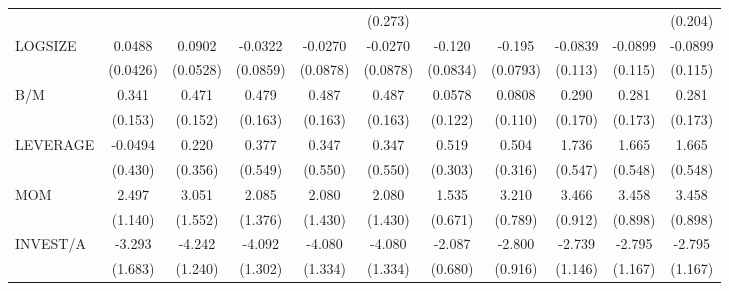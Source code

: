 \begin{table}[htbp]
\begin{tabular}{l*{10}{c}}
                &                  &                  &                  &                  &  (0.273)         &                  &                  &                  &                  &  (0.204)         \\
LOGSIZE         &   0.0488         &   0.0902\sym{*}  &  -0.0322         &  -0.0270         &  -0.0270         &   -0.120         &   -0.195\sym{**} &  -0.0839         &  -0.0899         &  -0.0899         \\
                & (0.0426)         & (0.0528)         & (0.0859)         & (0.0878)         & (0.0878)         & (0.0834)         & (0.0793)         &  (0.113)         &  (0.115)         &  (0.115)         \\
B/M             &    0.341\sym{**} &    0.471\sym{***}&    0.479\sym{***}&    0.487\sym{***}&    0.487\sym{***}&   0.0578         &   0.0808         &    0.290\sym{*}  &    0.281         &    0.281         \\
                &  (0.153)         &  (0.152)         &  (0.163)         &  (0.163)         &  (0.163)         &  (0.122)         &  (0.110)         &  (0.170)         &  (0.173)         &  (0.173)         \\
LEVERAGE        &  -0.0494         &    0.220         &    0.377         &    0.347         &    0.347         &    0.519\sym{*}  &    0.504         &    1.736\sym{***}&    1.665\sym{***}&    1.665\sym{***}\\
                &  (0.430)         &  (0.356)         &  (0.549)         &  (0.550)         &  (0.550)         &  (0.303)         &  (0.316)         &  (0.547)         &  (0.548)         &  (0.548)         \\
MOM             &    2.497\sym{**} &    3.051\sym{*}  &    2.085         &    2.080         &    2.080         &    1.535\sym{**} &    3.210\sym{***}&    3.466\sym{***}&    3.458\sym{***}&    3.458\sym{***}\\
                &  (1.140)         &  (1.552)         &  (1.376)         &  (1.430)         &  (1.430)         &  (0.671)         &  (0.789)         &  (0.912)         &  (0.898)         &  (0.898)         \\
INVEST/A        &   -3.293\sym{*}  &   -4.242\sym{***}&   -4.092\sym{***}&   -4.080\sym{***}&   -4.080\sym{***}&   -2.087\sym{***}&   -2.800\sym{***}&   -2.739\sym{**} &   -2.795\sym{**} &   -2.795\sym{**} \\
                &  (1.683)         &  (1.240)         &  (1.302)         &  (1.334)         &  (1.334)         &  (0.680)         &  (0.916)         &  (1.146)         &  (1.167)         &  (1.167)         \\

\end{tabular}
\end{table}
